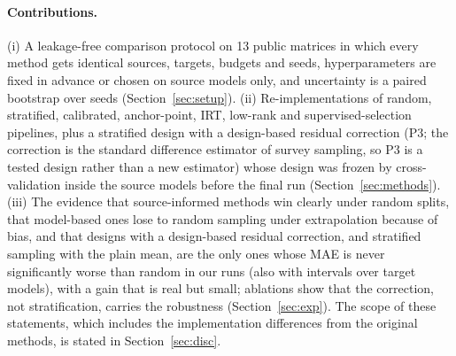\paragraph{Contributions.}
(i) A leakage-free comparison protocol on 13 public matrices in which every method gets identical sources, targets, budgets and seeds, hyperparameters are fixed in advance or chosen on source models only, and uncertainty is a paired bootstrap over seeds (Section~\ref{sec:setup}). (ii) Re-implementations of random, stratified, calibrated, anchor-point, IRT, low-rank and supervised-selection pipelines, plus a stratified design with a design-based residual correction (P3; the correction is the standard difference estimator of survey sampling, so P3 is a tested design rather than a new estimator) whose design was frozen by cross-validation inside the source models before the final run (Section~\ref{sec:methods}). (iii) The evidence that source-informed methods win clearly under random splits, that model-based ones lose to random sampling under extrapolation because of bias, and that designs with a design-based residual correction, and stratified sampling with the plain mean, are the only ones whose MAE is never significantly worse than random in our runs (also with intervals over target models), with a gain that is real but small; ablations show that the correction, not stratification, carries the robustness (Section~\ref{sec:exp}). The scope of these statements, which includes the implementation differences from the original methods, is stated in Section~\ref{sec:disc}.
